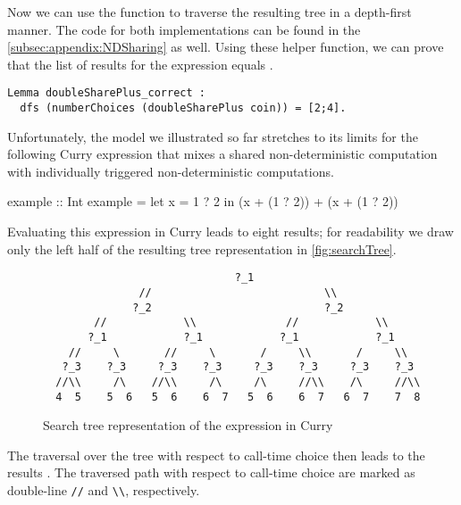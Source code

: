 Now we can use the function  to
traverse the resulting tree in a depth-first manner.
The code for both implementations can be found in the
\autoref{subsec:appendix:NDSharing} as well.
Using these helper function, we can prove that the list of results for
the expression  equals \cinl{[2;4]}.

\begin{verbatim}
Lemma doubleSharePlus_correct :
  dfs (numberChoices (doubleSharePlus coin)) = [2;4].
\end{verbatim}

Unfortunately, the model we illustrated so far stretches to its limits
for the following Curry expression that mixes a shared
non-deterministic computation with individually triggered
non-deterministic computations.

\begin{curry}
example :: Int
example = let x = 1 ? 2 in (x + (1 ? 2)) + (x + (1 ? 2))  
\end{curry}

Evaluating this expression in Curry leads to eight results; for
readability we draw only the left half of the resulting tree
representation in \autoref{fig:searchTree}.

\begin{figure}[h]
\centering
\begin{BVerbatim}
                              ?_1
               //                           \\
              ?_2                           ?_2
        //            \\              //            \\
       ?_1            ?_1            ?_1            ?_1
    //     \       //     \       /     \\       /     \\
   ?_3    ?_3     ?_3    ?_3     ?_3    ?_3     ?_3    ?_3
  //\\     /\    //\\     /\     /\     //\\    /\     //\\
  4  5    5  6   5  6    6  7   5  6    6  7   6  7    7  8
\end{BVerbatim}
\caption{Search tree representation of the expression 
  in Curry}
\label{fig:searchTree}
\end{figure}

The traversal over the tree with respect to call-time choice then
leads to the results .
The traversed path with respect to call-time choice are marked as
double-line \verb|//| and \verb|\\|, respectively.

